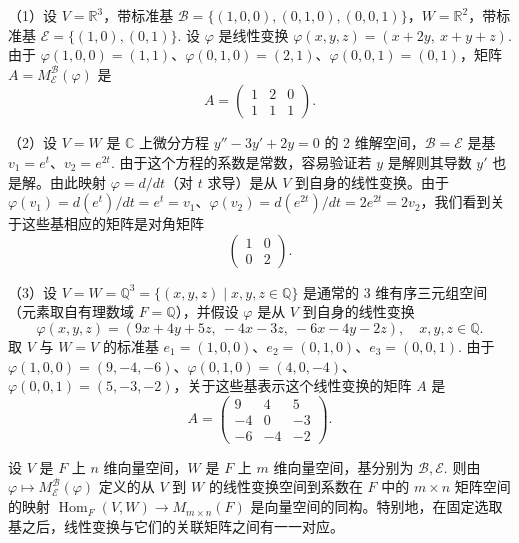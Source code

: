 \begin{example}
（1）设 \(V = \mathbb{R}^3\)，带标准基 \(\mathcal{B} = \{(1, 0, 0), (0, 1, 0), (0, 0, 1)\}\)，\(W = \mathbb{R}^2\)，带标准基 \(\mathcal{E} = \{(1, 0), (0, 1)\}\). 设 \(\varphi\) 是线性变换 \(\varphi(x, y, z) = (x+2y,\ x+y+z)\). 由于 \(\varphi(1, 0, 0) = (1, 1)\)、\(\varphi(0, 1, 0) = (2, 1)\)、\(\varphi(0, 0, 1) = (0, 1)\)，矩阵 \(A = M_{\mathcal{E}}^{\mathcal{B}}(\varphi)\) 是
\[
A = \begin{pmatrix} 1 & 2 & 0 \\ 1 & 1 & 1 \end{pmatrix}.
\]

（2）设 \(V = W\) 是 \(\mathbb{C}\) 上微分方程 \(y''-3y'+2y = 0\) 的 2 维解空间，\(\mathcal{B} = \mathcal{E}\) 是基 \(v_1 = e^t\)、\(v_2 = e^{2t}\). 由于这个方程的系数是常数，容易验证若 \(y\) 是解则其导数 \(y'\) 也是解。由此映射 \(\varphi = d/dt\)（对 \(t\) 求导）是从 \(V\) 到自身的线性变换。由于 \(\varphi(v_1) = d(e^t)/dt = e^t = v_1\)、\(\varphi(v_2) = d(e^{2t})/dt = 2e^{2t} = 2v_2\)，我们看到关于这些基相应的矩阵是对角矩阵
\[
\begin{pmatrix} 1 & 0 \\ 0 & 2 \end{pmatrix}.
\]

（3）设 \(V = W = \mathbb{Q}^3 = \{(x, y, z) \mid x, y, z \in \mathbb{Q}\}\) 是通常的 3 维有序三元组空间（元素取自有理数域 \(F = \mathbb{Q}\)），并假设 \(\varphi\) 是从 \(V\) 到自身的线性变换
\[
\varphi(x, y, z) = (9x+4y+5z,\ -4x-3z,\ -6x-4y-2z), \quad x, y, z \in \mathbb{Q}.
\]
取 \(V\) 与 \(W = V\) 的标准基 \(e_1 = (1, 0, 0)\)、\(e_2 = (0, 1, 0)\)、\(e_3 = (0, 0, 1)\). 由于 \(\varphi(1, 0, 0) = (9, -4, -6)\)、\(\varphi(0, 1, 0) = (4, 0, -4)\)、\(\varphi(0, 0, 1) = (5, -3, -2)\)，关于这些基表示这个线性变换的矩阵 \(A\) 是
\[
A = \begin{pmatrix} 9 & 4 & 5 \\ -4 & 0 & -3 \\ -6 & -4 & -2 \end{pmatrix}.
\]
\end{example}

\begin{theorem}\label{thm:11.10}
设 \(V\) 是 \(F\) 上 \(n\) 维向量空间，\(W\) 是 \(F\) 上 \(m\) 维向量空间，基分别为 \(\mathcal{B}, \mathcal{E}\). 则由 \(\varphi \mapsto M_{\mathcal{E}}^{\mathcal{B}}(\varphi)\) 定义的从 \(V\) 到 \(W\) 的线性变换空间到系数在 \(F\) 中的 \(m \times n\) 矩阵空间的映射 \(\operatorname{Hom}_F(V, W) \to M_{m \times n}(F)\) 是向量空间的同构。特别地，在固定选取基之后，线性变换与它们的关联矩阵之间有一一对应。
\end{theorem}

